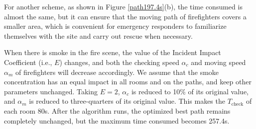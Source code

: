 For another scheme, as shown in Figure \ref{path197.4s}(b), the time consumed is almost the same, but it can ensure that the moving path of firefighters covers a smaller area, which is convenient for emergency responders to familiarize themselves with the site and carry out rescue when necessary.

When there is smoke in the fire scene, the value of the Incident Impact Coefficient (i.e., \( E \)) changes, and both the checking speed \( \alpha_c \) and moving speed \( \alpha_m \) of firefighters will decrease accordingly. We assume that the smoke concentration has an equal impact in all rooms and on the paths, and keep other parameters unchanged. Taking \( E = 2 \), \( \alpha_c \) is reduced to 10\% of its original value, and \( \alpha_m \) is reduced to three-quarters of its original value. This makes the \( T_{\text{check}} \) of each room 80s. After the algorithm runs, the optimized best path remains completely unchanged, but the maximum time consumed becomes 257.4s.
